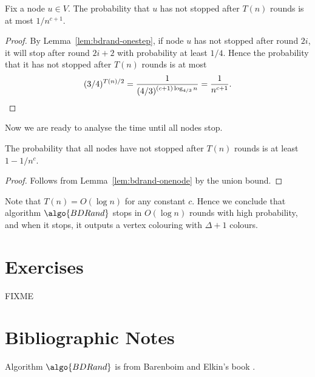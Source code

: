 \begin{lemma}\label{lem:bdrand-onenode}
    Fix a node $u \in V$. The probability that $u$ has not stopped after $T(n)$ rounds is at most $1/n^{c+1}$.
\end{lemma}
\begin{proof}
    By Lemma~\ref{lem:bdrand-onestep}, if node $u$ has not stopped after round $2i$, it will stop after round $2i+2$ with probability at least $1/4$. Hence the probability that it has not stopped after $T(n)$ rounds is at most
    \[
        (3/4)^{T(n)/2} = \frac{1}{(4/3)^{(c+1) \log_{4/3} n}} = \frac{1}{n^{c+1}}. \qedhere
    \]
\end{proof}

Now we are ready to analyse the time until all nodes stop.

\begin{theorem}\label{thm:bdrand}
    The probability that all nodes have not stopped after $T(n)$ rounds is at least $1 - 1/n^c$.
\end{theorem}
\begin{proof}
    Follows from Lemma~\ref{lem:bdrand-onenode} by the union bound.
\end{proof}

Note that $T(n) = O(\log n)$ for any constant $c$. Hence we conclude that algorithm $\algo{BDRand}$ stops in $O(\log n)$ rounds with high probability, and when it stops, it outputs a vertex colouring with $\Delta+1$ colours.


\section{Exercises}

\begin{ex}
    FIXME
\end{ex}



\section{Bibliographic Notes}

Algorithm $\algo{BDRand}$ is from Barenboim and Elkin's book \cite[Section 10.1]{barenboim13distributed}.
